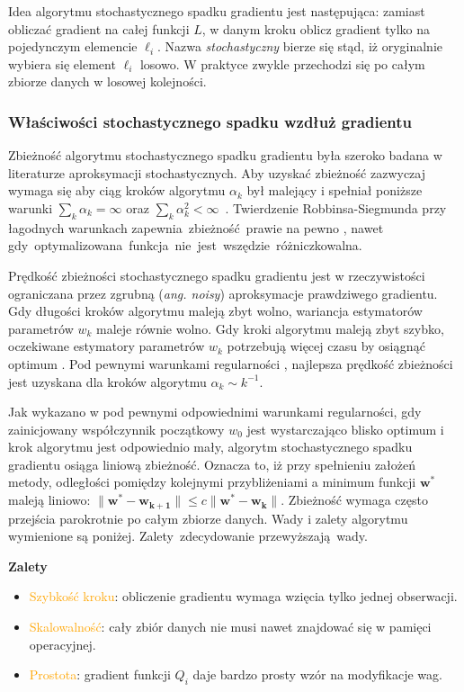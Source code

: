 Idea algorytmu stochastycznego spadku gradientu jest następująca: zamiast obliczać gradient na całej funkcji $L$, w danym kroku oblicz
gradient tylko na pojedynczym elemencie $\ell_{i}$. Nazwa \textit{stochastyczny} bierze się stąd, iż oryginalnie wybiera
się element $\ell_{i}$ losowo. W praktyce zwykle przechodzi się po całym zbiorze danych w losowej kolejności.

\subsubsection{Właściwości stochastycznego spadku wzdłuż gradientu}

Zbieżność algorytmu stochastycznego spadku gradientu była szeroko badana w literaturze aproksymacji stochastycznych. Aby uzyskać zbieżność zazwyczaj wymaga się aby ciąg kroków algorytmu $\alpha_k$ był malejący i spełniał poniższe warunki $\sum\nolimits_k \alpha_k = \infty$ oraz $\sum\nolimits_k \alpha_k^2 < \infty$~\cite{bott1}.
Twierdzenie Robbinsa-Siegmunda \cite{robbins} przy łagodnych warunkach zapewnia~zbieżność~prawie na pewno \cite{bottDOD}, nawet  gdy~optymalizowana~funkcja~nie~jest~wszędzie~różniczkowalna.

Prędkość zbieżności stochastycznego spadku gradientu jest w rzeczywistości ograniczana przez zgrubną (\textit{ang. noisy}) aproksymacje prawdziwego gradientu. Gdy długości kroków algorytmu
maleją zbyt wolno, wariancja estymatorów parametrów $w_k$ maleje równie wolno. Gdy kroki algorytmu maleją
zbyt szybko, oczekiwane estymatory parametrów $w_k$ potrzebują więcej czasu by osiągnąć optimum \cite{bott1}. Pod pewnymi warunkami regularności \cite{murata}, najlepsza prędkość zbieżności jest uzyskana dla kroków algorytmu $\alpha_k\sim k^{-1}$.

Jak wykazano w \cite{dennis} pod pewnymi odpowiednimi warunkami regularności, gdy zainicjowany współczynnik początkowy $w_0$ jest wystarczająco blisko optimum i krok algorytmu jest odpowiednio mały, algorytm stochastycznego spadku gradientu osiąga liniową zbieżność. Oznacza to, iż przy spełnieniu założeń metody, odległości pomiędzy kolejnymi przybliżeniami a minimum funkcji $\mathbf{w^{\ast}}$ maleją liniowo: $\parallel \mathbf{w^{\ast}} - \mathbf{w_{k+1}} \parallel \leqslant c \parallel \mathbf{w^{\ast}} - \mathbf{w_k} \parallel$. Zbieżność wymaga często przejścia parokrotnie po całym
zbiorze danych. Wady i zalety algorytmu wymienione są poniżej. Zalety~zdecydowanie przewyższają~wady.

\textbf{Zalety} \vspace{-5pt}
\begin{itemize}
\item \textcolor{orange}{Szybkość kroku}: obliczenie gradientu wymaga wzięcia tylko jednej
obserwacji.
\item \textcolor{orange}{Skalowalność}: cały zbiór danych nie musi nawet znajdować się
w pamięci operacyjnej.
\item \textcolor{orange}{Prostota}: gradient funkcji  $Q_{i}$ daje bardzo prosty wzór na
modyfikacje wag.
\end{itemize}


